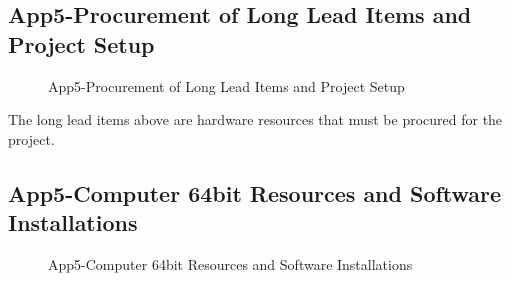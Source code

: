 	
\pagebreak	
\subsection{App5-Procurement of Long Lead Items and Project Setup}
\begin{figure}[htbp]
	\begin{center}
		\caption{App5-Procurement of Long Lead Items and Project Setup}
		\label{fig:App5-02-Research-Implementation-Plan.png}
	\end{center}
\end{figure}

The long lead items above are hardware resources that must be procured for the project.

\pagebreak
\subsection{App5-Computer 64bit Resources and Software Installations}
\begin{figure}[htbp]
	\begin{center}
		\caption{App5-Computer 64bit Resources and Software Installations}
		\label{fig:App5-03-Research-Implementation-Plan.png}
	\end{center}
\end{figure}

